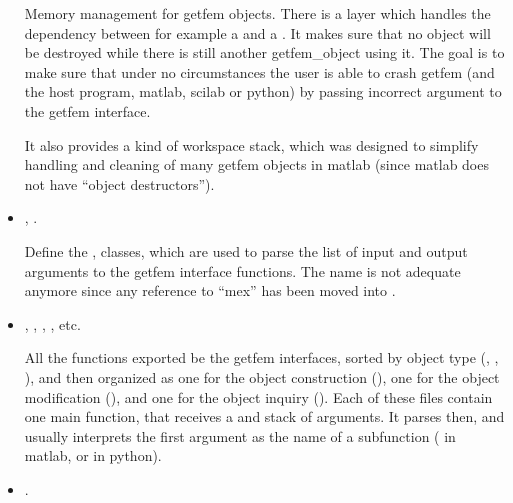 \documentclass[a4paper,11pt,english]{sphinxmanual}
\begin{document}
\begin{itemize}
Memory management for getfem objects. There is a layer which handles the
dependency between for example a  and a .
It makes sure that no object
will be destroyed while there is still another getfem\_object using it.
The goal
is to make sure that under no circumstances the user is able to crash getfem
(and the host program, matlab, scilab or python) by passing incorrect
argument to the getfem interface.

It also provides a kind of workspace stack, which was designed to simplify
handling and cleaning of many getfem objects in matlab (since matlab does not
have “object destructors”).

\item {} 
, .

Define the ,  classes, which are used to parse the
list of input and output arguments to the getfem interface functions.
The name  is not adequate anymore since any reference to “mex”
has been moved into
.

\item {} 
, , ,
, etc.

All the functions exported be the getfem interfaces, sorted by object type
(, , ), and then organized as one for
the object construction (), one for the object modification
(), and one for the object inquiry (). Each of
these files contain one main function, that receives a  and
 stack of arguments. It parses then, and usually interprets the
first argument as the name of a subfunction ( in
matlab, or  in python).

\item {} 
.


\end{itemize}
\end{document}
